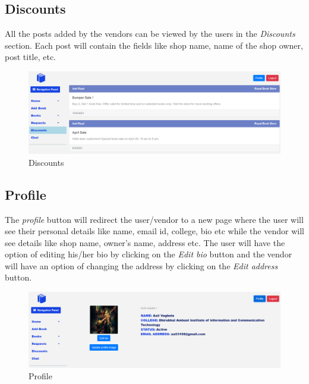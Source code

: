 \documentclass[conference]{IEEEtran}
\begin{document}
\subsection{Discounts}
All the posts added by the vendors can be viewed by the users in the \emph{Discounts} section. Each post will contain the fields like shop name, name of the shop owner, post title, etc.
\begin{figure}[h]
     \centering
     \includegraphics[scale=0.20,margin=2,frame]{discounts.PNG}
     \caption{Discounts}
     \label{fig:discounts}
 \end{figure}

\subsection{Profile}
The \emph{profile} button will redirect the user/vendor to a new page where the user will see their personal details like name, email id, college, bio etc while the vendor will see details like shop name, owner's name, address etc. The user will have the option of editing his/her bio by clicking on the \emph{Edit bio} button and the vendor will have an option of changing the address by clicking on the \emph{Edit address} button.
\begin{figure}[h]
     \centering
     \includegraphics[scale=0.20,margin=2,frame]{profile.PNG}
     \caption{Profile}
     \label{fig:profile}
 \end{figure}
\end{document}
